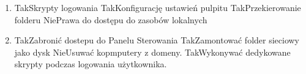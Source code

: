 \begin{enumerate}
		\item {}
		{Tak}{Skrypty logowania}
		{Tak}{Konfigurację ustawień pulpitu}
		{Tak}{Przekierowanie folderu}
		{Nie}{Prawa do dostępu do zasobów lokalnych}
		
		\item {}
		{Tak}{Zabronić dostepu do Panelu Sterowania}
		{Tak}{Zamontować folder sieciowy jako dysk}
		{Nie}{Usuwać kopmputery z domeny.}
		{Tak}{Wykonywać dedykowane skrypty podczas logowania użytkownika.}
		
	\end{enumerate}